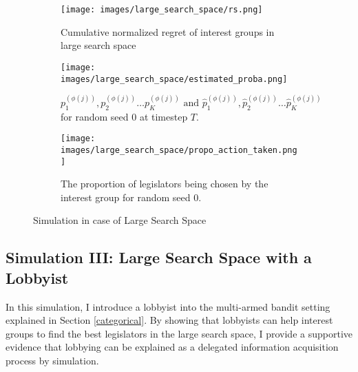 \documentclass{article}
\begin{document}
\begin{figure}[h!]
    \centering %
    \begin{subfigure}[b]{0.45\textwidth}
        \texttt{[image: images/large\_search\_space/rs.png]}
        
        \caption{Cumulative normalized regret of interest groups in large search space}
        \label{fig:rs_lg}
    \end{subfigure}
    \hfill
    \begin{subfigure}[b]{0.45\textwidth}
        \texttt{[image: images/large\_search\_space/estimated\_proba.png]}
        \caption{$p_1^{(\phi(j))}, p_2^{(\phi(j))} \hdots p_K^{(\phi(j))} \text{ and } \hat{p}_1^{(\phi(j))}, \hat{p}_2^{(\phi(j))} \hdots \hat{p}_K^{(\phi(j))}$ for random seed $0$ at timestep $T$.}
        \label{fig:lgproba}
    \end{subfigure}

    \begin{subfigure}[b]{1\columnwidth}
        \centering
        \texttt{[image: images/large\_search\_space/propo\_action\_taken.png]}
        \caption{The proportion of legislators being chosen by the interest group for random seed $0$.}
        \label{fig:lgpropo}
    \end{subfigure}
    \caption{Simulation in case of Large Search Space}
\end{figure}

\subsection{\large{Simulation III: Large Search Space with a Lobbyist}}\label{sim3}

In this simulation, I introduce a lobbyist into the multi-armed bandit setting explained in Section \ref{categorical}.
By showing that lobbyists can help interest groups to find the best legislators in the large search space, 
I provide a supportive evidence that lobbying can be explained as a delegated information acquisition process by simulation.
\end{document}
